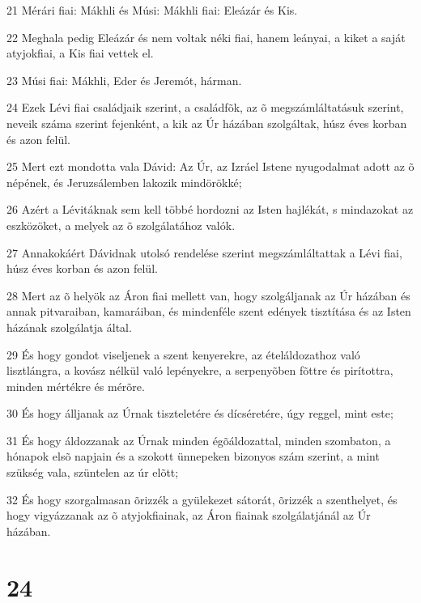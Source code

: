 \par 21 Mérári fiai: Mákhli és Músi: Mákhli fiai: Eleázár és Kis.
\par 22 Meghala pedig Eleázár és nem voltak néki fiai, hanem leányai, a kiket a saját atyjokfiai, a Kis fiai vettek el.
\par 23 Músi fiai: Mákhli, Eder és Jeremót, hárman.
\par 24 Ezek Lévi fiai családjaik szerint, a családfõk, az õ megszámláltatásuk szerint, neveik száma szerint fejenként, a kik az Úr házában szolgáltak, húsz éves korban és azon felül.
\par 25 Mert ezt mondotta vala Dávid: Az Úr, az Izráel Istene nyugodalmat adott az õ népének, és Jeruzsálemben lakozik mindörökké;
\par 26 Azért a Lévitáknak sem kell többé hordozni az Isten hajlékát, s mindazokat az eszközöket, a melyek az õ szolgálatához valók.
\par 27 Annakokáért Dávidnak utolsó rendelése szerint megszámláltattak a Lévi fiai, húsz éves korban és azon felül.
\par 28 Mert az õ helyök az Áron fiai mellett van, hogy szolgáljanak az Úr házában és annak pitvaraiban, kamaráiban, és mindenféle szent edények tisztítása és az Isten házának szolgálatja által.
\par 29 És hogy gondot viseljenek a szent kenyerekre, az ételáldozathoz  való lisztlángra, a kovász nélkül való lepényekre, a serpenyõben fõttre és pirítottra, minden mértékre és mérõre.
\par 30 És hogy álljanak az Úrnak tiszteletére és dícséretére, úgy reggel, mint este;
\par 31 És hogy áldozzanak az Úrnak minden égõáldozattal, minden szombaton, a hónapok elsõ napjain és a szokott ünnepeken bizonyos szám szerint, a mint szükség vala, szüntelen az úr elõtt;
\par 32 És hogy szorgalmasan õrizzék a gyülekezet sátorát, õrizzék a szenthelyet, és hogy vigyázzanak az õ atyjokfiainak, az Áron fiainak szolgálatjánál az Úr házában.

\chapter{24}

